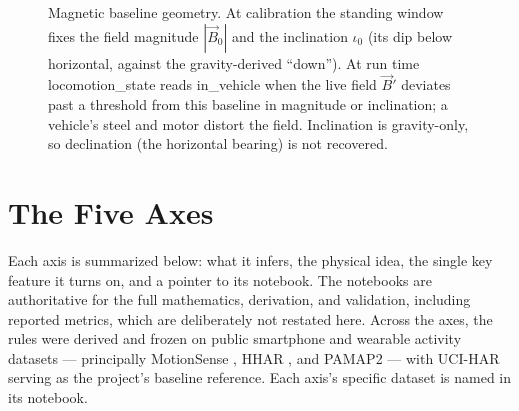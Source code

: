 \documentclass[11pt]{article}
\newcommand{\axis}[1]{\textsf{#1}}          %
\begin{document}
\begin{figure}[ht]
\centering
{}
\caption{Magnetic baseline geometry. At calibration the standing window fixes the field
magnitude $|\vec B_0|$ and the inclination $\iota_0$ (its dip below horizontal, against
the gravity-derived ``down''). At run time \axis{locomotion\_state} reads
\textsf{in\_vehicle} when the live field $\vec B'$ deviates past a threshold from this
baseline in magnitude or inclination; a vehicle's steel and motor distort the field.
Inclination is gravity-only, so declination (the horizontal bearing) is not recovered.}
\label{fig:mag}
\end{figure}

\section{The Five Axes}

Each axis is summarized below: what it infers, the physical idea, the single key
feature it turns on, and a pointer to its notebook. The notebooks are authoritative for
the full mathematics, derivation, and validation, including reported metrics, which are
deliberately not restated here. Across the axes, the rules were derived and frozen on
public smartphone and wearable activity datasets --- principally MotionSense
\citep{malekzadeh2019motionsense}, HHAR \citep{stisen2015hhar}, and PAMAP2
\citep{reiss2012pamap2} --- with UCI-HAR \citep{anguita2013ucihar} serving as the
project's baseline reference. Each axis's specific dataset is named in its notebook.
\end{document}
